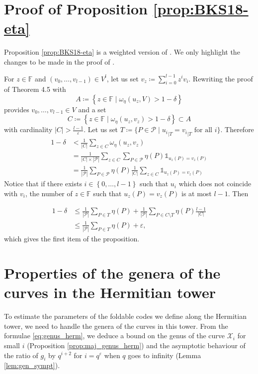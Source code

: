 \documentclass[10pt,a4paper]{article}
\renewcommand\epsilon{\varepsilon}
\newcommand\F{\mathbb{F}}
\def\rest#1#2{{{#1}_{|#2}}}
\newcommand{\set}[1]{\left\{#1\right\}}
\newcommand{\range}[1]{\set{0,\dots,#1-1}}
\newcommand\calX{\mathcal{X}}
\newcommand\calP{\mathcal{P}}
\newcommand\mydef{\coloneqq}
\theoremstyle{plain}
\theoremstyle{plain}
\theoremstyle{definition}
\theoremstyle{remark}
\theoremstyle{plain}
\begin{document}
%
%
%

%


\appendix

\section{Proof of Proposition \ref{prop:BKS18-eta}}\label{app:prop-ldc}

Proposition \ref{prop:BKS18-eta} is a weighted version of \cite[Theorem~4.5]{BKS18}. We only highlight the changes to be made in the proof of \cite[Theorem~4.5]{BKS18}.

For $z \in \F$ and $(v_0,\dots,v_{l-1}) \in V^l$, let us set $\displaystyle{v_z \mydef \sum_{i = 0}^{l - 1} z^i v_i}$. Rewriting the proof of Theorem 4.5 \cite{BKS18} with
\[A \mydef\left\{z\in \F \mid \omega_\eta\left(u_z, V\right)>1-\delta \right\}\]
provides $v_0, \ldots, v_{l-1} \in V$ and a set
\[C\mydef \left\{z \in \F \mid \omega_\eta\left(u_z,v_z \right) > 1-\delta\right\} \subset A \]
with cardinality $|C| > \frac{l-1}{\epsilon}$. Let us set $T\mydef \{P \in \calP \mid \rest{u_i}{T}=\rest{v_i}{T} \text{ for all } i\}$. Therefore
\begin{align*}
	1-\delta &< \frac{1}{|C|} \sum_{z \in C} \omega_\eta\left(u_z, v_z\right)\\
	& =\frac{1}{|C|\times |\calP|} \sum_{z \in C} \sum_{P \in \calP} \eta(P) \mathds{1}_{u_z(P) = v_z(P)}\\
	& =\frac{1}{|\calP|} \sum_{P \in \calP} \eta(P) \frac{1}{|C|} \sum_{z \in C}  \mathds{1}_{u_z(P) = v_z(P)}
\end{align*}
Notice that if there exists $i \in\range{l}$ such that $u_i$ which does not coincide with $v_i$, the number of $z \in \F$ such that $u_z(P)= v_z(P)$ is at most $l-1$. Then 

\begin{align*}
	1-\delta & \leq \frac{1}{|\calP|} \sum_{P \in T} \eta(P) + \frac{1}{|\calP|} \sum_{P \in C\setminus T} \eta(P) \frac{l-1}{|C|}\\
	& \leq \frac{1}{|\calP|} \sum_{P \in T} \eta(P) + \epsilon,
\end{align*}
which gives the first item of the proposition.


\section{Properties of the genera of the curves in the Hermitian tower}\label{app:gen_HT}

To estimate the parameters of the foldable codes we define along the Hermitian tower, we need to handle the genera of the curves in this tower. From the formulae \eqref{eq:genus_herm}, we deduce a bound on the genus of the curve $\calX_i$ for small $i$ (Proposition \ref{prop:maj_genus_herm}) and the asymptotic behaviour of the ratio of $g_i$ by $q^{i+2}$ for $i=q^{\epsilon}$ when $q$ goes to infinity (Lemma \ref{lem:gen_sympt}).
\end{document}
